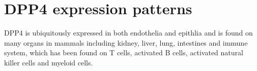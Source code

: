 \section{DPP4 expression patterns}
DPP4 is ubiquitously expressed in both endothelia and epithlia and is found on many organs in mammals including kidney, liver, lung, intestines and immune system, which has been found on T cells, activated B cells, activated natural killer cells and myeloid cells.~\cite{Abbott1994,Shingu2003,Hong1989,Gutschmidt1981,Dikov2004,Bühling1995,Tanaka1992,Gorrell1991}